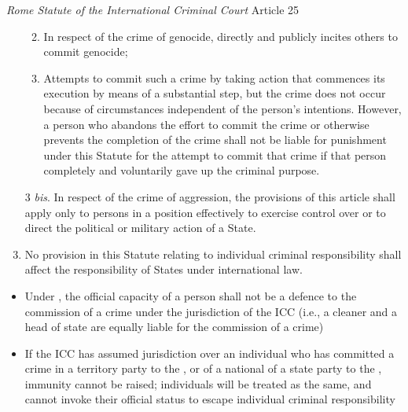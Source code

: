 \begin{statutedetails}{\textit{Rome Statute of the International Criminal Court} Article 25}
\begin{enumerate}
\begin{enumerate}[label=(\alph*)]
\begin{enumerate}[label=(\roman*)]
            \end{enumerate}
            \item In respect of the crime of genocide, directly and publicly incites others to commit genocide; 
            \item Attempts to commit such a crime by taking action that commences its execution by means of a substantial step, but the crime does not occur because of circumstances independent of the person's intentions. However, a person who abandons the effort to commit the crime or otherwise prevents the completion of the crime shall not be liable for punishment under this Statute for the attempt to commit that crime if that person completely and voluntarily gave up the criminal purpose.
        \end{enumerate}
        \item[3 \textit{bis}.] In respect of the crime of aggression, the provisions of this article shall apply only to persons in a position effectively to exercise control over or to direct the political or military action of a State.
        \item No provision in this Statute relating to individual criminal responsibility shall affect the responsibility of States under international law.
    \end{enumerate}
\end{statutedetails}

\begin{itemize}
    \item Under , the official capacity of a person shall not be a defence to the commission of a crime under the jurisdiction of the ICC (i.e., a cleaner and a head of state are equally liable for the commission of a crime)
    \item If the ICC has assumed jurisdiction over an individual who has committed a crime in a territory party to the , or of a national of a state party to the , immunity cannot be raised; individuals will be treated as the same, and cannot invoke their official status to escape individual criminal responsibility
\end{itemize}

